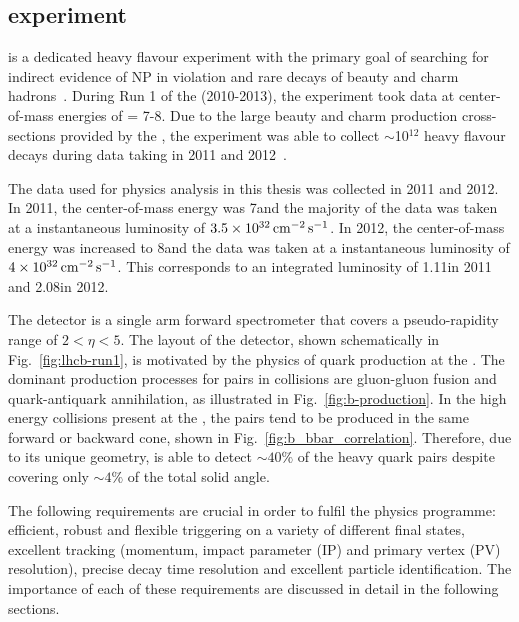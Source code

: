 \subsection{\lhcb experiment}
\label{sec:lhcb:lhcb}

\lhcb is a dedicated heavy flavour experiment with the primary goal of searching for indirect evidence of NP in \CP violation and rare decays of beauty and charm hadrons~\cite{lhcb}. During Run 1 of the \lhc (2010-2013), the \lhcb experiment took data at center-of-mass energies of \sqs = 7-8\tev. Due to the large beauty and charm production cross-sections provided by the \lhc, the \lhcb experiment was able to collect $\sim$10$^{12}$ heavy flavour decays during data taking in 2011 and 2012~\cite{LHCb-DP-2014-002}.

The data used for physics analysis in this thesis was collected in 2011 and 2012. In 2011, the center-of-mass energy was 7\tev and the majority of the data was taken at a instantaneous luminosity of $3.5\times10^{32}\mathrm{ \,cm}^{-2}\mathrm{{\,s}}^{-1}$. In 2012, the center-of-mass energy was increased to 8\tev and the data was taken at a instantaneous luminosity of $4\times10^{32}\mathrm{ \,cm}^{-2}\mathrm{{\,s}}^{-1}$. This corresponds to an integrated luminosity of 1.11\invfb in 2011 and 2.08\invfb in 2012.

The \lhcb detector is a single arm forward spectrometer that covers a pseudo-rapidity range of $2 < \eta < 5$. The layout of the \lhcb detector, shown schematically in Fig.~\ref{fig:lhcb-run1}, is motivated by the physics of \bquark quark production at the \lhc. The dominant production processes for \bquark\bquarkbar pairs in \proton\proton collisions are gluon-gluon fusion and quark-antiquark annihilation, as illustrated in Fig.~\ref{fig:b-production}. In the high energy collisions present at the \lhc, the \bquark\bquarkbar pairs tend to be produced in the same forward or backward cone, shown in Fig.~\ref{fig:b_bbar_correlation}.  Therefore, due to its unique geometry, \lhcb is able to detect $\sim40\%$ of the heavy quark pairs despite covering only $\sim4\%$ of the total solid angle.

The following requirements are crucial in order to fulfil the \lhcb physics programme: efficient, robust and flexible triggering on a variety of different final states, excellent tracking (momentum, impact parameter (IP) and primary vertex (PV) resolution), precise decay time resolution and excellent particle identification. The importance of each of these requirements are discussed in detail in the following sections.

